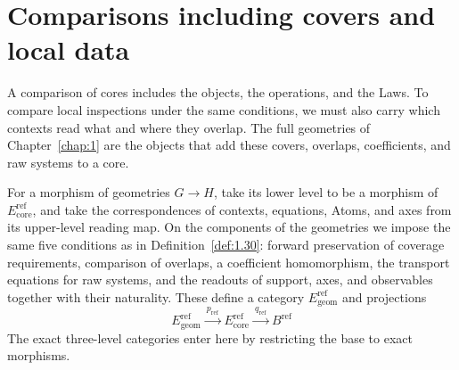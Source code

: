 \section{Comparisons including covers and local data}\label{sec:5.8}

A comparison of cores includes the objects, the operations, and the Laws. To compare local
inspections under the same conditions, we must also carry which contexts read what and
where they overlap. The full geometries of Chapter~\ref{chap:1} are the objects that add
these covers, overlaps, coefficients, and raw systems to a core.

\begin{definition}\label{def:5.30}

For a morphism of geometries $G\to H$, take its lower level to be a morphism of
$E_{\mathrm{core}}^{\mathrm{ref}}$, and take the correspondences of contexts, equations,
Atoms, and axes from its upper-level reading map. On the components of the geometries we
impose the same five conditions as in Definition~\ref{def:1.30}: forward preservation of
coverage requirements, comparison of overlaps, a coefficient homomorphism, the transport
equations for raw systems, and the readouts of support, axes, and observables together with
their naturality. These define a category $E_{\mathrm{geom}}^{\mathrm{ref}}$ and
projections
\begin{equation*}
E_{\mathrm{geom}}^{\mathrm{ref}}
\xrightarrow{\ p_{\mathrm{ref}}\ }
E_{\mathrm{core}}^{\mathrm{ref}}
\xrightarrow{\ q_{\mathrm{ref}}\ }B^{\mathrm{ref}}
\tag{5.34}\label{eq:5.34}
\end{equation*}
The exact three-level categories enter here by restricting the base to exact morphisms.

\end{definition}

